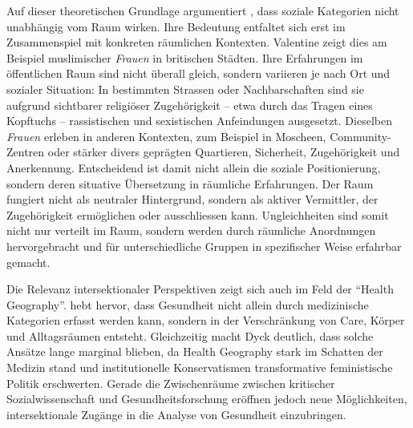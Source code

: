 Auf dieser theoretischen Grundlage argumentiert \textcite{valentineTheorizingResearchingIntersectionality2007}, dass soziale Kategorien nicht unabhängig vom Raum wirken. Ihre Bedeutung entfaltet sich erst im Zusammenspiel mit konkreten räumlichen Kontexten. Valentine zeigt dies am Beispiel muslimischer \emph{Frauen} in britischen Städten. Ihre Erfahrungen im öffentlichen Raum sind nicht überall gleich, sondern variieren je nach Ort und sozialer Situation: In bestimmten Strassen oder Nachbarschaften sind sie aufgrund sichtbarer religiöser Zugehörigkeit -- etwa durch das Tragen eines Kopftuchs -- rassistischen und sexistischen Anfeindungen ausgesetzt. Dieselben \emph{Frauen} erleben in anderen Kontexten, zum Beispiel in Moscheen, Community-Zentren oder stärker divers geprägten Quartieren, Sicherheit, Zugehörigkeit und Anerkennung. Entscheidend ist damit nicht allein die soziale Positionierung, sondern deren situative Übersetzung in räumliche Erfahrungen. Der Raum fungiert nicht als neutraler Hintergrund, sondern als aktiver Vermittler, der Zugehörigkeit ermöglichen oder ausschliessen kann. Ungleichheiten sind somit nicht nur verteilt im Raum, sondern werden durch räumliche Anordnungen hervorgebracht und für unterschiedliche Gruppen in spezifischer Weise erfahrbar gemacht.

Die Relevanz intersektionaler Perspektiven zeigt sich auch im Feld der \enquote{Health Geography}. \textcite{dyckFeminismHealthGeography2003} hebt hervor, dass Gesundheit nicht allein durch medizinische Kategorien erfasst werden kann, sondern in der Verschränkung von Care, Körper und Alltagsräumen entsteht. Gleichzeitig macht Dyck deutlich, dass solche Ansätze lange marginal blieben, da Health Geography stark im Schatten der Medizin stand und institutionelle Konservatismen transformative feministische Politik erschwerten. Gerade die Zwischenräume zwischen kritischer Sozialwissenschaft und Gesundheitsforschung eröffnen jedoch neue Möglichkeiten, intersektionale Zugänge in die Analyse von Gesundheit einzubringen. 

